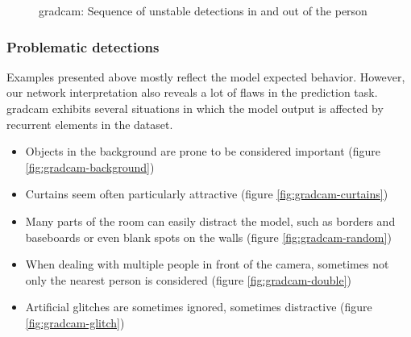 \begin{figure}[!h]
\begin{center}
\begin{subfigure}[h]{0.24\textwidth}
		\end{subfigure}
	\end{center}
	\vspace{-0.5cm}
	\caption[\gls{gradcam}: Sequence of unstable detections in and out of the person]{\gls{gradcam}: Sequence of unstable detections in and out of the person}
	\label{fig:gradcam-seq-beard}
\end{figure}

\subsubsection*{Problematic detections}

Examples presented above mostly reflect the model expected behavior. However, our network interpretation also reveals a lot of flaws in the prediction task. \gls{gradcam} exhibits several situations in which the model output is affected by recurrent elements in the dataset.

\begin{itemize}
	\item Objects in the background are prone to be considered important (figure \ref{fig:gradcam-background})
	\item Curtains seem often particularly attractive (figure \ref{fig:gradcam-curtains})
	\item Many parts of the room can easily distract the model, such as borders and baseboards or even blank spots on the walls (figure \ref{fig:gradcam-random})
	\item When dealing with multiple people in front of the camera, sometimes not only the nearest person is considered (figure \ref{fig:gradcam-double})
	\item Artificial glitches are sometimes ignored, sometimes distractive (figure \ref{fig:gradcam-glitch})
\end{itemize}

